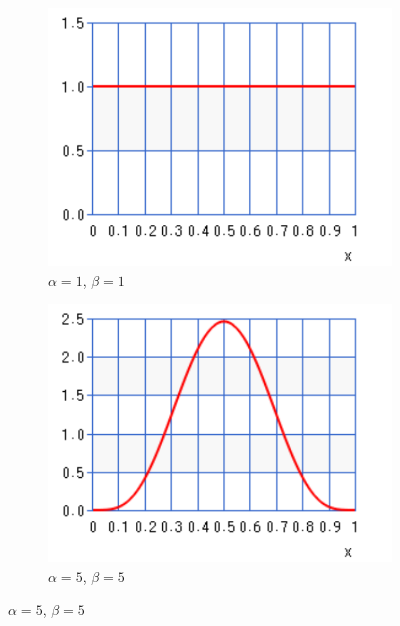 \begin{figure}[htbp]
      \begin{subfigure}{0.49\textwidth}
            \centering
            \includegraphics[width=\textwidth]{images/beta_1_1.pdf}
            \caption{$\alpha=1$, $\beta=1$}
            \label{sec:bhh:hyper_parameters:normalisation_beta_1_1}
      \end{subfigure}
      \begin{subfigure}{0.49\textwidth}
            \centering
            \includegraphics[width=\textwidth]{images/beta_5_5.pdf}
            \caption{$\alpha=5$, $\beta=5$}
            \label{sec:bhh:hyper_parameters:normalisation_beta_5_5}
      \end{subfigure}

\end{figure}
